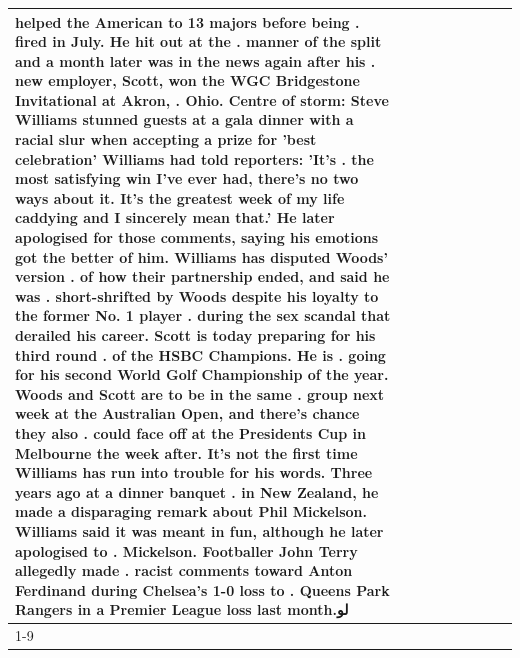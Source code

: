 \begin{table}[H]
\begin{tabular}{lllrlllll}
helped the American to 13 majors before being . fired in July. He hit out at the . manner of the split and a month later was in the news again after his . new employer, Scott, won the WGC Bridgestone Invitational at Akron, . Ohio. Centre of storm: Steve Williams stunned guests at a gala dinner with a racial slur when accepting a prize for 'best celebration' Williams had told reporters: 'It's . the most satisfying win I've ever had, there's no two ways about it. It's the greatest week of my life caddying and I sincerely mean that.' He later apologised for those comments, saying his emotions got the better of him. Williams has disputed Woods' version . of how their partnership ended, and said he was . short-shrifted by Woods despite his loyalty to the former No. 1 player . during the sex scandal that derailed his career. Scott is today preparing for his third round . of the HSBC Champions. He is . going for his second World Golf Championship of the year. Woods and Scott are to be in the same . group next week at the Australian Open, and there's chance they also . could face off at the Presidents Cup in Melbourne the week after. It's not the first time Williams has run into trouble for his words. Three years ago at a dinner banquet . in New Zealand, he made a disparaging remark about Phil Mickelson. Williams said it was meant in fun, although he later apologised to . Mickelson. Footballer John Terry allegedly made . racist comments toward Anton Ferdinand during Chelsea's 1-0 loss to . Queens Park Rangers in a Premier League loss last month.لو \\
\cline{1-9}

\end{tabular}
\end{table}
